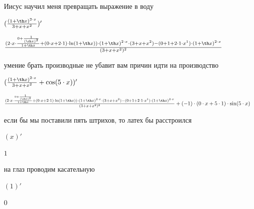 \documentclass[a4paper,12pt]{article}
\begin{document}
Иисус научил меня превращать выражение в воду 

\begin{center}$( \frac{(1+ \th x)^{2 \cdot x}}{3+x+x^{2}} )'$

\end{center}



\begin{center}$ \frac{(2 \cdot x \cdot  \frac{0+ \frac{1}{( \ch x)^{2}} }{1+ \th x} +(0 \cdot x+2 \cdot 1) \cdot  \ln (1+ \th x)) \cdot (1+ \th x)^{2 \cdot x} \cdot (3+x+x^{2})-(0+1+2 \cdot 1 \cdot x^{1}) \cdot (1+ \th x)^{2 \cdot x}}{(3+x+x^{2})^{2}} $

\end{center}

умение брать производные не убавит вам причин идти на производство 

\begin{center}$( \frac{(1+ \th x)^{2 \cdot x}}{3+x+x^{2}} + \cos (5 \cdot x))'$

\end{center}



\begin{center}$ \frac{(2 \cdot x \cdot  \frac{0+ \frac{1}{( \ch x)^{2}} }{1+ \th x} +(0 \cdot x+2 \cdot 1) \cdot  \ln (1+ \th x)) \cdot (1+ \th x)^{2 \cdot x} \cdot (3+x+x^{2})-(0+1+2 \cdot 1 \cdot x^{1}) \cdot (1+ \th x)^{2 \cdot x}}{(3+x+x^{2})^{2}} +(-1) \cdot (0 \cdot x+5 \cdot 1) \cdot  \sin (5 \cdot x)$

\end{center}

если бы мы поставили пять штрихов, то латех бы расстроился 

\begin{center}$(x)'$

\end{center}



\begin{center}$1$

\end{center}

на глаз проводим касательную 

\begin{center}$(1)'$

\end{center}



\begin{center}$0$

\end{center}
\end{document}
